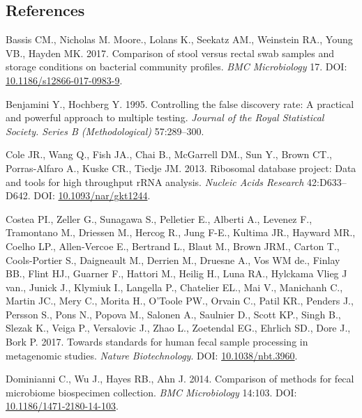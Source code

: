 \documentclass[12pt,]{article}
\begin{document}
\subsection{References}\label{references}

\hypertarget{refs}{}
\hypertarget{ref-storage_Bassis_2017}{}
Bassis CM., Nicholas M. Moore., Lolans K., Seekatz AM., Weinstein RA.,
Young VB., Hayden MK. 2017. Comparison of stool versus rectal swab
samples and storage conditions on bacterial community profiles.
\emph{BMC Microbiology} 17. DOI:
\href{https://doi.org/10.1186/s12866-017-0983-9}{10.1186/s12866-017-0983-9}.

\hypertarget{ref-benjamini_controlling_1995}{}
Benjamini Y., Hochberg Y. 1995. Controlling the false discovery rate: A
practical and powerful approach to multiple testing. \emph{Journal of
the Royal Statistical Society. Series B (Methodological)} 57:289--300.

\hypertarget{ref-rdp_Cole_2013}{}
Cole JR., Wang Q., Fish JA., Chai B., McGarrell DM., Sun Y., Brown CT.,
Porras-Alfaro A., Kuske CR., Tiedje JM. 2013. Ribosomal database
project: Data and tools for high throughput rRNA analysis. \emph{Nucleic
Acids Research} 42:D633--D642. DOI:
\href{https://doi.org/10.1093/nar/gkt1244}{10.1093/nar/gkt1244}.

\hypertarget{ref-metagenomcis_bias_Costea_2017}{}
Costea PI., Zeller G., Sunagawa S., Pelletier E., Alberti A., Levenez
F., Tramontano M., Driessen M., Hercog R., Jung F-E., Kultima JR.,
Hayward MR., Coelho LP., Allen-Vercoe E., Bertrand L., Blaut M., Brown
JRM., Carton T., Cools-Portier S., Daigneault M., Derrien M., Druesne
A., Vos WM de., Finlay BB., Flint HJ., Guarner F., Hattori M., Heilig
H., Luna RA., Hylckama Vlieg J van., Junick J., Klymiuk I., Langella P.,
Chatelier EL., Mai V., Manichanh C., Martin JC., Mery C., Morita H.,
O'Toole PW., Orvain C., Patil KR., Penders J., Persson S., Pons N.,
Popova M., Salonen A., Saulnier D., Scott KP., Singh B., Slezak K.,
Veiga P., Versalovic J., Zhao L., Zoetendal EG., Ehrlich SD., Dore J.,
Bork P. 2017. Towards standards for human fecal sample processing in
metagenomic studies. \emph{Nature Biotechnology}. DOI:
\href{https://doi.org/10.1038/nbt.3960}{10.1038/nbt.3960}.

\hypertarget{ref-preservation_Dominianni_2014}{}
Dominianni C., Wu J., Hayes RB., Ahn J. 2014. Comparison of methods for
fecal microbiome biospecimen collection. \emph{BMC Microbiology} 14:103.
DOI:
\href{https://doi.org/10.1186/1471-2180-14-103}{10.1186/1471-2180-14-103}.
\end{document}
